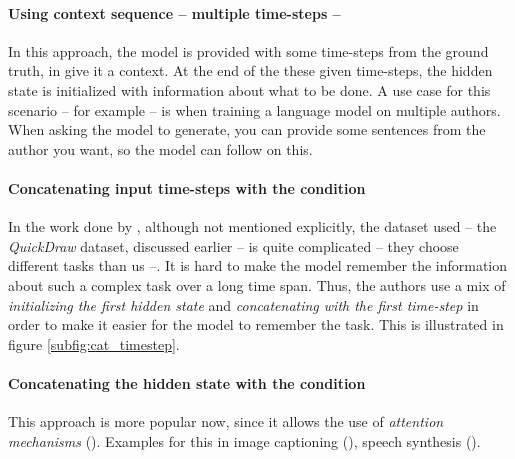 \paragraph{Using context sequence -- multiple time-steps --} In this approach, the model is provided with some time-steps from the ground truth, in give it a context. At the end of the these given time-steps, the hidden state is initialized with information about what to be done. A use case for this scenario -- for example -- is when training a language model on multiple authors. When asking the model to generate, you can provide some sentences from the author you want, so the model can follow on this.

\paragraph{Concatenating input time-steps with the condition} In the work done by \citep{ha2017neural}, although not mentioned explicitly, the dataset used -- the \textit{QuickDraw} dataset, discussed earlier -- is quite complicated -- they choose different tasks than us --. It is hard to make the model remember the information about such a complex task over a long time span. Thus, the authors use a mix of \textit{initializing the first hidden state} and \textit{concatenating with the first time-step} in order to make it easier for the model to remember the task. This is illustrated in figure \ref{subfig:cat_timestep}.

\paragraph{Concatenating the hidden state with the condition} This approach is more popular now, since it allows the use of \textit{attention mechanisms} (\citep{NIPS2010_4089,denil2012learning}). Examples for this in image captioning (\citep{xu2015show}), speech synthesis (\citep{wang2017tacotron}).

